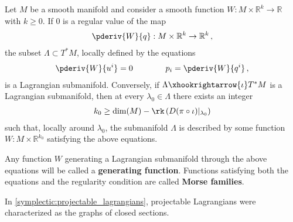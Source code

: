     \begin{theorem}\label{symplectic:maslow_hormander}
        Let $M$ be a smooth manifold and consider a smooth function $W:M\times\mathbb{R}^k\rightarrow\mathbb{R}$ with $k\geq 0$. If 0 is a regular value of the map
        \begin{gather}
            \pderiv{W}{q}:M\times\mathbb{R}^k\rightarrow\mathbb{R}^k\,,
        \end{gather}
        the subset $\Lambda\subset T^*M$, locally defined by the equations
        \begin{gather}
            \pderiv{W}{u^i} = 0 \qquad\qquad p_i=\pderiv{W}{q^i}\,,
        \end{gather}
        is a Lagrangian submanifold. Conversely, if $\Lambda\xhookrightarrow{\iota}T^*M$ is a Lagrangian submanifold, then at every $\lambda_0\in\Lambda$ there exists an integer
        \begin{gather}
            k_0\geq\dim(M) - \rk\left(D(\pi\circ\iota)|_{\lambda_0}\right)
        \end{gather}
        such that, locally around $\lambda_0$, the submanifold $\Lambda$ is described by some function $W:M\times\mathbb{R}^{k_0}$ satisfying the above equations.
    \end{theorem}
    Any function $W$ generating a Lagrangian submanifold through the above equations will be called a \textbf{generating function}. Functions satisfying both the equations and the regularity condition are called \textbf{Morse families}.


    In \cref{symplectic:projectable_lagrangians}, projectable Lagrangians were characterized as the graphs of closed sections.

